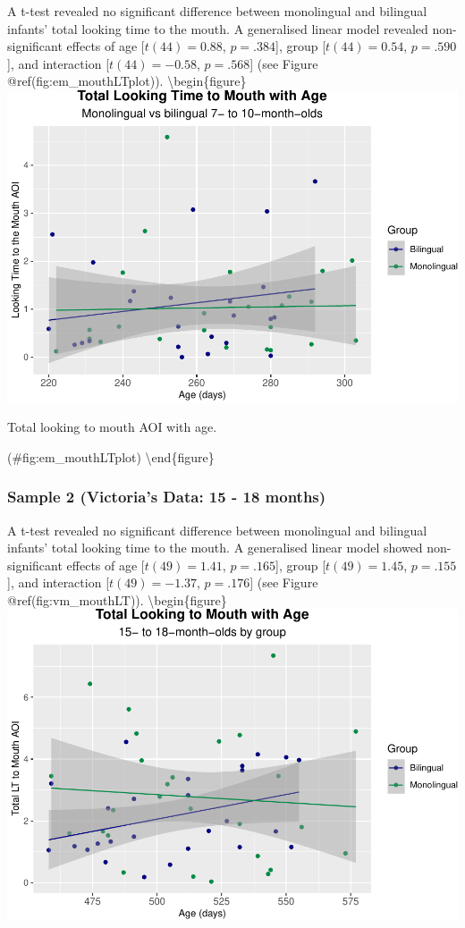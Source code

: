 \documentclass[english,man,floatsintext]{apa6}
\begin{document}
A t-test revealed no significant difference between monolingual and bilingual infants' total looking time to the mouth. A generalised linear model revealed non-significant effects of age {[}\(t(44) = 0.88\), \(p = .384\){]}, group {[}\(t(44) = 0.54\), \(p = .590\){]}, and interaction {[}\(t(44) = -0.58\), \(p = .568\){]} (see Figure @ref(fig:em\_mouthLTplot)).
\textbackslash{}begin\{figure\}
\includegraphics{Effects_of_early_language_experience_on_infants_files/figure-latex/em_mouthLTplot-1}

\caption{Total looking to mouth AOI with age.}

(\#fig:em\_mouthLTplot)
\textbackslash{}end\{figure\}

\hypertarget{sample-2-victorias-data-15---18-months-1}{%
\subsubsection{Sample 2 (Victoria's Data: 15 - 18 months)}\label{sample-2-victorias-data-15---18-months-1}}

A t-test revealed no significant difference between monolingual and bilingual infants' total looking time to the mouth. A generalised linear model showed non-significant effects of age {[}\(t(49) = 1.41\), \(p = .165\){]}, group {[}\(t(49) = 1.45\), \(p = .155\){]}, and interaction {[}\(t(49) = -1.37\), \(p = .176\){]} (see Figure @ref(fig:vm\_mouthLT)).
\textbackslash{}begin\{figure\}
\includegraphics{Effects_of_early_language_experience_on_infants_files/figure-latex/vm_mouthLT-1}
\end{document}
